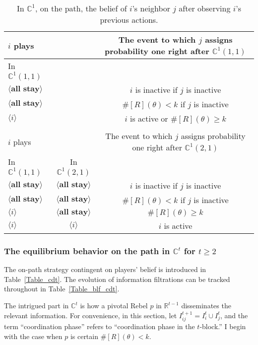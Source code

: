 \documentclass[12pt,letter]{article}
\newcommand{\Kappa}{\mathbb{C}}
\newcommand{\Omicron}{\mathbb{R}}
\theoremstyle{definition}
\theoremstyle{remark}
\theoremstyle{claim}
\begin{document}
\begin{table}[!htbp]
\caption{In $\Kappa^1$, on the path, the belief of $i$'s neighbor $j$ after observing $i$'s previous actions.}
\label{Table_blf_cd0}
\begin{center}
\begin{tabular}{l  c | c}
 	$i$ plays	  			&	  &  The event to which $j$ assigns probability one  right after $\Kappa^1(1,1)$\\
\hline
\hline
In $\Kappa^1(1,1)$	&		&		  \\
\hline
  $\langle \textbf{all stay} \rangle$	& &   $i$ is inactive if $j$ is inactive \\
  $\langle \textbf{all stay} \rangle$	&  &  $\#[R](\theta)< k$ if $j$ is inactive\\
  $\langle i \rangle$	&	&  $i$ is active or $\#[R](\theta)\geq k$    \\
  \hline
  \\
 	$i$ plays	  	&  	  &The event to which $j$ assigns probability one  right after $\Kappa^1(2,1)$\\
\hline
\hline
	In $\Kappa^1(1,1)$		&			In $\Kappa^1(2,1)$	&  \\
\hline
  $\langle \textbf{all stay} \rangle$	&  $\langle \textbf{all stay} \rangle$ &  $i$ is inactive if $j$ is inactive \\
  $\langle \textbf{all stay} \rangle$	&  $\langle \textbf{all stay} \rangle$ &  $\#[R](\theta)< k$ if $j$ is inactive\\
  $\langle i \rangle$	&	$\langle \textbf{all stay} \rangle$ &  $\#[R](\theta)\geq k$    \\
  $\langle i \rangle$	&	$\langle i \rangle$ &  $i$ is active  \\
  \hline
\end{tabular}
\end{center}
\end{table}




\subsubsection{The equilibrium behavior on the path in $\Kappa^t$ for $t\geq 2$}
\label{sec:cdt}
The on-path strategy contingent on players' belief is introduced in Table~\ref{Table_cdt}. The evolution of information filtrations can be tracked throughout in Table~\ref{Table_blf_cdt}. 

The intrigued part in $\Kappa^t$ is how a pivotal Rebel $p$ in $\Omicron^{t-1}$ disseminates the relevant information. For convenience, in this section, let $I^{t+1}_{ij}=I^t_i\cup I^t_j$, and the term ``coordination phase'' refers to ``coordination phase in the $t$-block.'' I begin with the case when $p$ is certain $\#[R](\theta)< k$.
\end{document}
